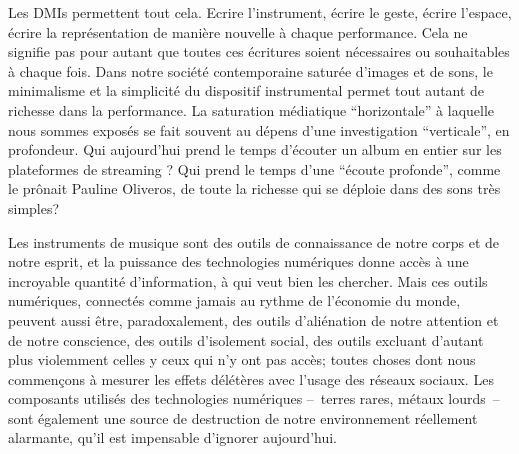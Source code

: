 Les \glspl{DMI} permettent tout cela. Ecrire l'instrument, écrire le geste, écrire l'espace, écrire la représentation de manière nouvelle à chaque performance. Cela ne signifie pas pour autant que toutes ces écritures soient nécessaires ou souhaitables à chaque fois. Dans notre société contemporaine saturée d'images et de sons, le minimalisme et la simplicité du dispositif instrumental permet tout autant de richesse dans la performance. La saturation médiatique ``horizontale'' à laquelle nous sommes exposés se fait souvent au dépens d'une investigation ``verticale'', en profondeur. Qui aujourd'hui prend le temps d'écouter un album en entier sur les plateformes de streaming ? Qui prend le temps d'une ``écoute profonde'', comme le prônait Pauline Oliveros, de toute la richesse qui se déploie dans des sons très simples?

Les instruments de musique sont des outils de connaissance de notre corps et de notre esprit, et la puissance des technologies numériques donne accès à une incroyable quantité d'information, à qui veut bien les chercher. Mais ces outils numériques, connectés comme jamais au rythme de l'économie du monde, peuvent aussi être, paradoxalement, des outils d'aliénation de notre attention et de notre conscience, des outils d'isolement social, des outils excluant d'autant plus violemment celles y ceux qui n'y ont pas accès; toutes choses dont nous commençons à mesurer les effets délétères avec l'usage des réseaux sociaux. Les composants utilisés des technologies numériques --~terres rares, métaux lourds~-- sont également une source de destruction de notre environnement réellement alarmante, qu'il est impensable d'ignorer aujourd'hui.




